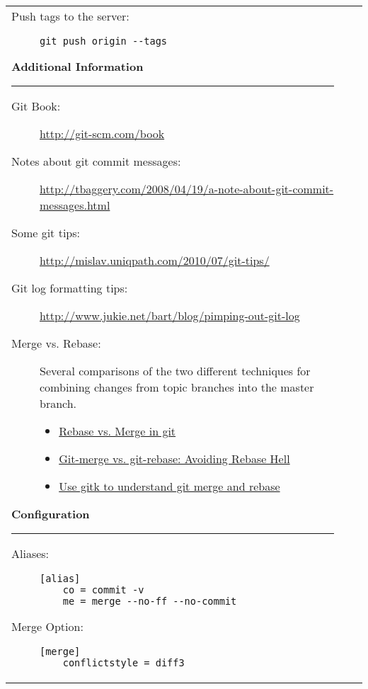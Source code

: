 \documentclass[landscape]{article}
\begin{document}
\begin{tabular*}{10.5in}{|p{2.9in}|p{2.9in}|p{2.9in}|}
\begin{flushleft}
\begin{description}
            \item[Push tags to the server:]
                {\verb!git push origin --tags!}
        \end{description}
        \textbf{\large{Additional Information}}
        \rule{2.9in}{.5pt}
        \small
        \begin{description}
            \item[Git Book:]{\url{http://git-scm.com/book}}
            \item[Notes about git commit messages:]
                {\url{http://tbaggery.com/2008/04/19/a-note-about-git-commit-messages.html}}
            \item[Some git tips:]
                {\url{http://mislav.uniqpath.com/2010/07/git-tips/}}
            \item[Git log formatting tips:]
                {\url{http://www.jukie.net/bart/blog/pimping-out-git-log}}
            \item[Merge vs. Rebase:]
                {Several comparisons of the two different techniques for
                combining changes from topic branches into the master branch.}
                \begin{itemize}
                    \item{\href{http://gitguru.com/2009/02/03/rebase-v-merge-in-git/}
                          {Rebase vs. Merge in git}}
                    \item{\href{http://www.jarrodspillers.com/2009/08/19/git-merge-vs-git-rebase-avoiding-rebase-hell/}
                          {Git-merge vs. git-rebase: Avoiding Rebase Hell}}
                    \item{\href{http://lostechies.com/joshuaflanagan/2010/09/03/use-gitk-to-understand-git-merge-and-rebase/}
                          {Use gitk to understand git merge and rebase}}
                \end{itemize}
        \end{description}
        \textbf{\large{Configuration}}
        \rule{2.9in}{.5pt}
        \small
        \begin{description}
            \item[Aliases:]
                {\begin{verbatim}
[alias]
    co = commit -v
    me = merge --no-ff --no-commit\end{verbatim}}
            \item[Merge Option:]
                {\begin{verbatim}
[merge]
	conflictstyle = diff3\end{verbatim}}
        \end{description}
    \end{flushleft}
\end{tabular*}
\end{document}
